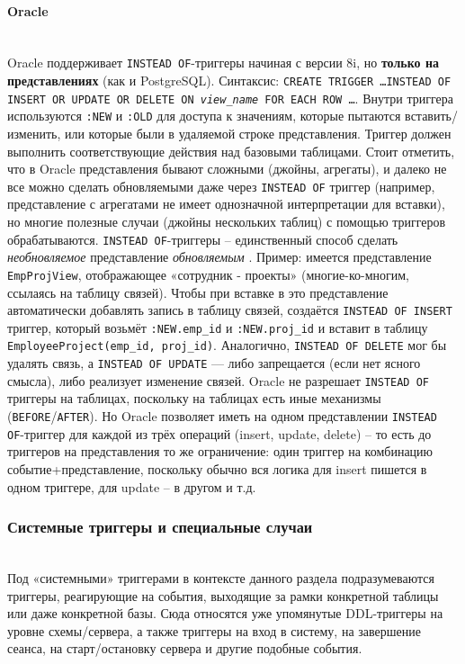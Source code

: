 \paragraph{\textbf{Oracle}} ~\\
 Oracle поддерживает \texttt{INSTEAD OF}-триггеры начиная с версии 8i, но \textbf{только на представлениях} (как и PostgreSQL). Синтаксис: \texttt{CREATE TRIGGER \ldots INSTEAD OF INSERT OR UPDATE OR DELETE ON \emph{view\_name} FOR EACH ROW \ldots}. Внутри триггера используются \texttt{:NEW} и \texttt{:OLD} для доступа к значениям, которые пытаются вставить/изменить, или которые были в удаляемой строке представления. Триггер должен выполнить соответствующие действия над базовыми таблицами. Стоит отметить, что в Oracle представления бывают сложными (джойны, агрегаты), и далеко не все можно сделать обновляемыми даже через \texttt{INSTEAD OF} триггер (например, представление с агрегатами не имеет однозначной интерпретации для вставки), но многие полезные случаи (джойны нескольких таблиц) с помощью триггеров обрабатываются. \texttt{INSTEAD OF}-триггеры – единственный способ сделать \textit{необновляемое} представление \textit{обновляемым} \autocite{oracledbdoc8}.
 Пример: имеется представление \texttt{EmpProjView}, отображающее «сотрудник - проекты» (многие-ко-многим, ссылаясь на таблицу связей). Чтобы при вставке в это представление автоматически добавлять запись в таблицу связей, создаётся \texttt{INSTEAD OF INSERT} триггер, который возьмёт \texttt{:NEW.emp\_id} и \texttt{:NEW.proj\_id} и вставит в таблицу \texttt{EmployeeProject(emp\_id, proj\_id)}. Аналогично, \texttt{INSTEAD OF DELETE} мог бы удалять связь, а \texttt{INSTEAD OF UPDATE} — либо запрещается (если нет ясного смысла), либо реализует изменение связей.
 Oracle не разрешает \texttt{INSTEAD OF} триггеры на таблицах, поскольку на таблицах есть иные механизмы (\texttt{BEFORE}/\texttt{AFTER}). Но Oracle позволяет иметь на одном представлении \texttt{INSTEAD OF}-триггер для каждой из трёх операций (insert, update, delete) – то есть до триггеров на представления то же ограничение: один триггер на комбинацию событие+представление, поскольку обычно вся логика для insert пишется в одном триггере, для update – в другом и т.д.

 \subsubsection{Системные триггеры и специальные случаи} ~\\
 Под «системными» триггерами в контексте данного раздела подразумеваются триггеры, реагирующие на события, выходящие за рамки конкретной таблицы или даже конкретной базы. Сюда относятся уже упомянутые DDL-триггеры на уровне схемы/сервера, а также триггеры на вход в систему, на завершение сеанса, на старт/остановку сервера и другие подобные события.

